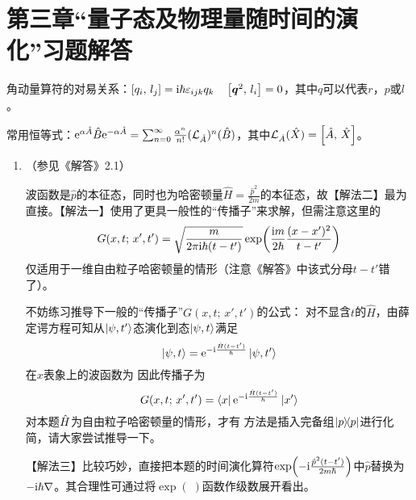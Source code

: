 \section{第三章“量子态及物理量随时间的演化”习题解答}
角动量算符的对易关系：$\left[q_i,\,l_j\right]=\mathrm{i}\hbar\varepsilon_{ijk} q_k\quad\left[\boldsymbol{q}^2,\,l_i\right]=0$，其中$q$可以代表$r$，$p$或$l$。

常用恒等式：$\mathrm{e}^{\alpha\hat{A}}\hat{B}\mathrm{e}^{-\alpha\hat{A}}=\sum_{n=0}^\infty\frac{\alpha^n}{n!}(\mathcal{L}_{\hat{A}})^n(\hat{B})$，其中$\mathcal{L}_{\hat{A}}(\hat{X})=\left[\hat{A},\,\hat{X}\right]$。

\begin{enumerate}[label=\textbf{3.\arabic*}, leftmargin=-0.5mm]

\item
（参见《解答》2.1）

波函数是$\hat{p}$的本征态，同时也为哈密顿量$\hat{H}=\frac{\hat{p}^2}{2m}$的本征态，故【解法二】最为直接。【解法一】使用了更具一般性的“传播子”来求解，但需注意这里的
\[G(x,t;\,x',t') = \sqrt{\frac{m}{2\pi\mathrm{i}\hbar (t-t')}}\exp(\frac{\mathrm{i} m}{2\hbar}\frac{(x-x')^2}{t-t'})\]
仅适用于一维自由粒子哈密顿量的情形（注意《解答》中该式分母$t-t'$错了）。

不妨练习推导下一般的“传播子”$G(x,t;\,x',t')$的公式：
对不显含$t$的$\hat{H}$，由薛定谔方程可知从$\ket{\psi,t'}$态演化到态$\ket{\psi,t}$满足
\[\ket{\psi,t} = \mathrm{e}^{-\mathrm{i}\frac{\hat{H}(t-t')}{\hbar}}\ket{\psi,t'}\]
在$x$表象上的波函数为
因此传播子为
\[G(x,t;\,x',t') = \bra{x}\mathrm{e}^{-\mathrm{i}\frac{\hat{H}(t-t')}{\hbar}}\ket{x'}\]
对本题$\hat{H}$为自由粒子哈密顿量的情形，才有
方法是插入完备组$\ketbra{p}$进行化简，请大家尝试推导一下。

【解法三】比较巧妙，直接把本题的时间演化算符$\exp(-\mathrm{i}\frac{\hat{p}^2(t-t')}{2m \hbar})$中$\hat{p}$替换为$-\mathrm{i}\hbar\nabla$。其合理性可通过将$\exp(\;)$函数作级数展开看出。


\end{enumerate}

